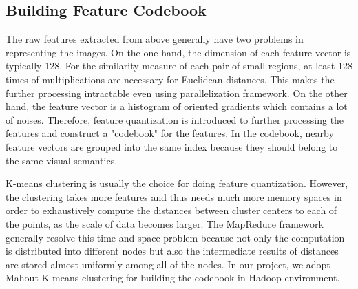 \documentclass{acm_proc_article-sp}
\begin{document}

\subsection{Building Feature Codebook}
The raw features extracted from above generally have two problems in representing the images. On the one hand, the dimension of each feature vector is typically 128. For the similarity measure of each pair of small regions, at least 128 times of multiplications are necessary for Euclidean distances. This makes the further processing intractable even using parallelization framework. On the other hand, the feature vector is a histogram of oriented gradients which contains a lot of noises. Therefore, feature quantization is introduced to further processing the features and construct a "codebook" for the features. In the codebook, nearby feature vectors are grouped into the same index because they should belong to the same visual semantics.

K-means clustering is usually the choice for doing feature quantization. However, the clustering takes more features and thus needs much more memory spaces in order to exhaustively compute the distances between cluster centers to each of the points, as the scale of data becomes larger. The MapReduce framework generally resolve this time and space problem because not only the computation is distributed into different nodes but also the intermediate results of distances are stored almost uniformly among all of the nodes. In our project, we adopt Mahout K-means clustering \cite{mahout} for building the codebook in Hadoop environment.
\end{document}
